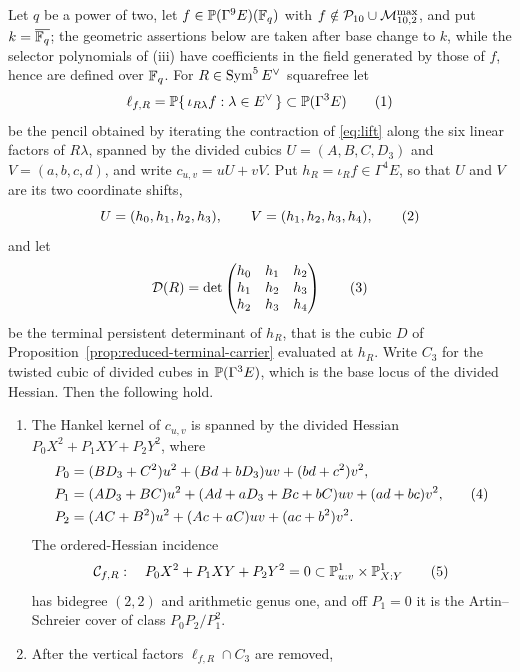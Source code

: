 \begin{lemma}
\label{lem:r10-hessian}%
%
Let $q$ be a power of two, let
$f\in\mathbb P(\Gamma^9E)(\mathbb F_q)$ with $f\notin\mathcal P_{10}\cup\mathcal M^{\max}_{10,2}$, and put
$k=\overline{\mathbb F_q}$; the geometric assertions below are taken after base change
to $k$, while the selector polynomials of (iii) have coefficients in the field
generated by those of $f$, hence are defined over $\mathbb F_q$.  For
$R\in\operatorname{Sym}^5E^\vee$ squarefree let
\[
 \ell_{f,R}=\PP\{\,\iota_{R\lambda}f:\lambda\in E^\vee\,\}
 \subset\PP(\Gamma^3E)
 \autoeqtag{eq:hessian-root-line}
\]
be the pencil obtained by iterating the contraction of \eqref{eq:lift} along
the six linear factors of $R\lambda$, spanned by the divided cubics
$U=(A,B,C,D_3)$ and $V=(a,b,c,d)$, and write $c_{u,v}=uU+vV$.  Put
$h_R=\iota_Rf\in\Gamma^4E$, so that $U$ and $V$ are its two coordinate shifts,
\[
 U=(h_0,h_1,h_2,h_3),\qquad V=(h_1,h_2,h_3,h_4),
 \autoeqtag{eq:hessian-shift-pencil}
\]
and let
\[
 \mathcal D(R)=\det\begin{pmatrix}
 h_0&h_1&h_2\\ h_1&h_2&h_3\\ h_2&h_3&h_4\end{pmatrix}
 \autoeqtag{eq:hessian-terminal-determinant}
\]
be the terminal persistent determinant of \(h_R\), that is the cubic $D$ of
Proposition~\ref{prop:reduced-terminal-carrier} evaluated at $h_R$.  Write
$C_3$ for the twisted cubic of divided cubes in $\mathbb P(\Gamma^3E)$, which is the
base locus of the divided Hessian.  Then the following hold.
\begin{enumerate}[label=\textup{(\roman*)}]
\item The Hankel kernel of $c_{u,v}$ is spanned by the divided Hessian
      $P_0X^2+P_1XY+P_2Y^2$, where
      \[
      \begin{aligned}
       P_0&=(BD_3+C^2)u^2+(Bd+bD_3)uv+(bd+c^2)v^2,\\
       P_1&=(AD_3+BC)u^2+(Ad+aD_3+Bc+bC)uv+(ad+bc)v^2,\\
       P_2&=(AC+B^2)u^2+(Ac+aC)uv+(ac+b^2)v^2 .
      \end{aligned}
      \autoeqtag{eq:hessian-coefficients}
      \]
      The ordered-Hessian incidence
      \[
       \cC_{f,R}:\quad P_0X^2+P_1XY+P_2Y^2=0
       \subset\PP^1_{u:v}\times\PP^1_{X:Y}
       \autoeqtag{eq:hessian-incidence}
      \]
      has bidegree $(2,2)$ and arithmetic genus one, and off $P_1=0$ it is
      the Artin--Schreier cover of class $P_0P_2/P_1^2$.
\item After the vertical factors $\ell_{f,R}\cap C_3$ are removed,

\end{enumerate}
\end{lemma}
